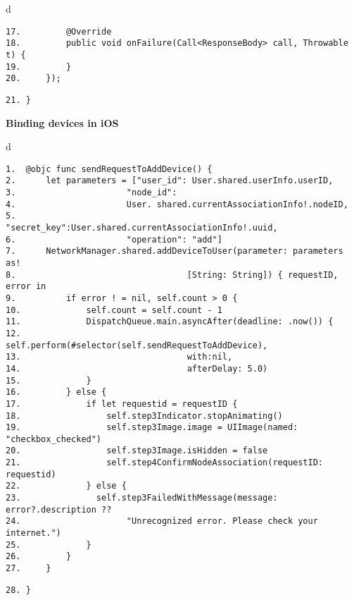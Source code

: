\documentclass[a4paper,12pt]{book}
\begin{document}
\begin{codebloc}
\begin{tabular}{d}
\vspace{2pt}
\begin{verbatim}
17.         @Override
18.         public void onFailure(Call<ResponseBody> call, Throwable t) {
19.         }
20.     });
\end{verbatim}
\verb|21. }|
\end{tabular}
\end{codebloc}

\vspace{6pt}
\textbf{Binding devices in iOS}


\begin{codebloc}
\begin{tabular}{d}
\vspace{2pt}
\begin{verbatim}
1.  @objc func sendRequestToAddDevice() {
2.      let parameters = ["user_id": User.shared.userInfo.userID,
3.                      "node_id":
4.                      User. shared.currentAssociationInfo!.nodeID, 
5.                      "secret_key":User.shared.currentAssociationInfo!.uuid, 
6.                      "operation": "add"]
7.      NetworkManager.shared.addDeviceToUser(parameter: parameters as!
8.                                  [String: String]) { requestID, error in
9.          if error ! = nil, self.count > 0 {
10.             self.count = self.count - 1
11.             DispatchQueue.main.asyncAfter(deadline: .now()) {
12.                 self.perform(#selector(self.sendRequestToAddDevice),
13.                                 with:nil,
14.                                 afterDelay: 5.0)
15.             }
16.         } else {
17.             if let requestid = requestID {
18.                 self.step3Indicator.stopAnimating()
19.                 self.step3Image.image = UIImage(named: "checkbox_checked")
20.                 self.step3Image.isHidden = false
21.                 self.step4ConfirmNodeAssociation(requestID: requestid)
22.             } else {
23.               self.step3FailedWithMessage(message: error?.description ??
24.                     "Unrecognized error. Please check your internet.")
25.             }
26.         }
27.     }
\end{verbatim}
\verb|28. }|
\end{tabular}
\end{codebloc}
\end{document}

